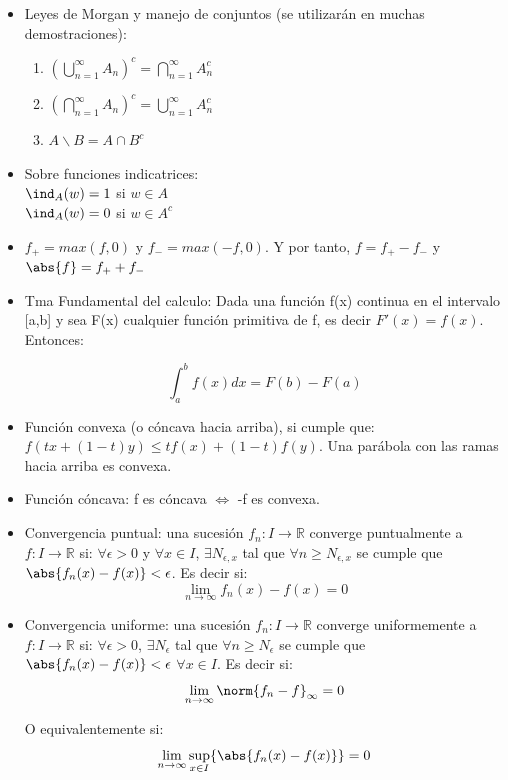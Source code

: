 \documentclass{apuntes}
\begin{document}
\begin{itemize}
\item Leyes de Morgan y manejo de conjuntos (se utilizarán en muchas demostraciones):
\begin{enumerate}
\item $(\bigcup_{n=1}^{\infty}A_n)^c = \bigcap_{n=1}^{\infty}A_n^c$
\item $(\bigcap_{n=1}^{\infty}A_n)^c = \bigcup_{n=1}^{\infty}A_n^c$
\item $A \backslash B = A \cap B^c$

\end{enumerate}
\item Sobre funciones indicatrices:\\
$\ind_A(w)=1$ si $w \in A$\\
$\ind_A(w)=0$ si $w \in A^c$

\item $f_+ = max(f,0)$ y $f_- = max(-f,0)$. Y por tanto, $f=f_+ -f_-$ y $\abs{f}=f_+ +f_-$

\item Tma Fundamental del calculo: Dada una función f(x) continua en el intervalo [a,b] y sea F(x) cualquier función primitiva de f, es decir $F '(x) = f(x)$. Entonces:

\[
\int_a^b f(x)dx = F(b)-F(a)
\]
\item Función convexa (o cóncava hacia arriba), si cumple que: $f(tx+(1-t)y) \leq tf(x)+(1-t)f(y)$. Una parábola con las ramas hacia arriba es convexa.
\item Función cóncava: f es cóncava $\Leftrightarrow$ -f es convexa.
\item Convergencia puntual: una sucesión $f_n:I\rightarrow \mathbb{R}$ converge puntualmente a $f:I\rightarrow \mathbb{R}$ si: $\forall \epsilon >0$ y $\forall x \in I$, $\exists N_{\epsilon, x}$ tal que $\forall n \geq N_{\epsilon, x}$ se cumple que $\abs{f_n(x)-f(x)}<\epsilon$. Es decir si:
\[
\lim_{n \rightarrow \infty} f_n(x)-f(x)=0
\]

\item Convergencia uniforme: una sucesión $f_n:I\rightarrow \mathbb{R}$ converge uniformemente a $f:I\rightarrow \mathbb{R}$ si: $\forall \epsilon >0$,  $\exists N_{\epsilon}$ tal que $\forall n \geq N_{\epsilon}$ se cumple que $\abs{f_n(x)-f(x)}<\epsilon$ $\forall x \in I$. Es decir si:
\[
\lim_{n \rightarrow \infty} \norm{f_n - f}_{\infty} = 0
\]

O equivalentemente si:
\[
\lim_{n \rightarrow \infty} \sup_{x \in I}\{\abs{f_n(x)-f(x)} \}=0
\]


\end{itemize}
\end{document}

